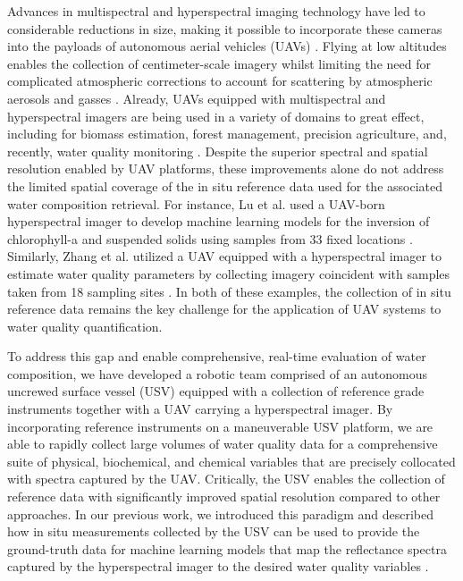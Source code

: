 \documentclass[remotesensing,article,accept,pdftex,moreauthors]{Definitions/mdpi}
\begin{document}
Advances in multispectral and hyperspectral imaging technology have led to considerable reductions in size, making it possible to incorporate these cameras into the payloads of autonomous aerial vehicles (UAVs) \cite{hruska2012radiometric}. Flying at low altitudes enables the collection of centimeter-scale imagery whilst limiting the need for complicated atmospheric corrections to account for scattering by atmospheric aerosols and gasses \cite{adao2017hyperspectral, banerjee2020uav}. Already, UAVs equipped with multispectral and hyperspectral imagers are being used in a variety of domains to great effect, including for biomass estimation, forest management, precision agriculture, and, recently, water quality monitoring \cite{adao2017hyperspectral, padua2017uas,arroyo2019implementation,kurihara2020unmanned, ehmann2019monitoring}. Despite the superior spectral and spatial resolution enabled by UAV platforms, these improvements alone do not address the limited spatial coverage of the in situ reference data used for the associated water composition retrieval. For instance, Lu et al. used a UAV-born hyperspectral imager to develop machine learning models for the inversion of chlorophyll-a and suspended solids using samples from 33 fixed locations \cite{lu2021retrieval}. Similarly, Zhang et al. utilized a UAV equipped with a hyperspectral imager to estimate water quality parameters by collecting imagery coincident with samples taken from 18 sampling sites \cite{zhang2022selection}. In both of these examples, the collection of in situ reference data remains the key challenge for the application of UAV systems to water quality quantification.

To address this gap and enable comprehensive, real-time evaluation of water composition, we have developed a robotic team comprised of an autonomous uncrewed surface vessel (USV) equipped with a collection of reference grade instruments together with a UAV carrying a hyperspectral imager. By incorporating reference instruments on a maneuverable USV platform, we are able to rapidly collect large volumes of water quality data for a comprehensive suite of physical, biochemical, and chemical variables that are precisely collocated with spectra captured by the UAV. Critically, the USV enables the collection of reference data with significantly improved spatial resolution compared to other approaches. In our previous work, we introduced this paradigm and described how in situ measurements collected by the USV can be used to provide the ground-truth data for machine learning models that map the reflectance spectra captured by the hyperspectral imager to the desired water quality variables \cite{robotTeam1}.
\end{document}
